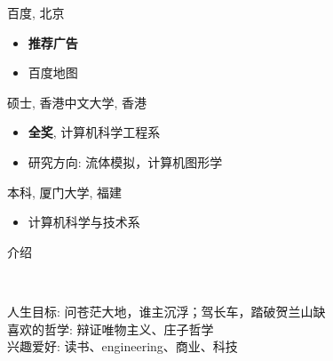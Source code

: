 \documentclass[20pt,a4paper]{article}
\newenvironment{changemargin}[2]{%
  \begin{list}{}{%
    \setlength{\topsep}{0pt}%
    \setlength{\leftmargin}{#1}%
    \setlength{\rightmargin}{#2}%
    \setlength{\listparindent}{\parindent}%
    \setlength{\itemindent}{\parindent}%
    \setlength{\parsep}{\parskip}%
  }%
  \item[]}{\end{list}
}
\newcommand{\lineover}{
	\begin{changemargin}{-0.05in}{-0.05in}
		\vspace*{-8pt}
		\hrulefill \\
		\vspace*{-2pt}
	\end{changemargin}
}
\newcommand{\header}[1]{
	\begin{changemargin}{-0.5in}{-0.5in}
		\scshape{#1}\\
  	\lineover
	\end{changemargin}
}
\newenvironment{body} {
	\vspace*{-16pt}
	\begin{changemargin}{-0.25in}{-0.5in}
  }	
	{\end{changemargin}
}
\begin{document}
\begin{body}
	\vspace{14pt}
	百度, 北京\\
	\begin{itemize}
		\item \textbf{推荐广告}  \hfill \emph{} \\
		\item 百度地图  \hfill \emph{} \\	
	\end{itemize}
	硕士, 香港中文大学, 香港\\
	\begin{itemize}    
    		\item \textbf{全奖}, 计算机科学工程系 \hfill \emph{} \\
		\item 研究方向: 流体模拟，计算机图形学\\
	\end{itemize}
	本科, 厦门大学, 福建\\
	\begin{itemize}
		\item 计算机科学与技术系  \hfill \emph{} \\
	\end{itemize}
\end{body}

\header{介绍}

\begin{body}
	\vspace{14pt}
	人生目标: 问苍茫大地，谁主沉浮；驾长车，踏破贺兰山缺\\
	喜欢的哲学: 辩证唯物主义、庄子哲学\\
	兴趣爱好: 读书、engineering、商业、科技
	
\end{body}

\end{document}
